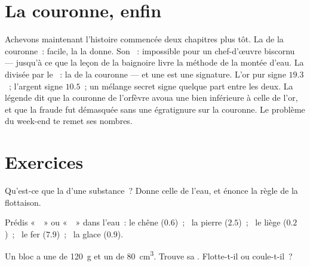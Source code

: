 \section{La couronne, enfin}

\begin{example}\label{ex:g6:density-floating:crown}
Achevons maintenant l'histoire commencée deux chapitres plus tôt. La
 de la couronne~: facile, la  la donne. Son ~:
impossible pour un chef-d'œuvre biscornu --- jusqu'à ce que la leçon
de la baignoire livre la méthode de la montée d'eau. La  divisée
par le ~: la \emph{} de la couronne --- et une
 est une signature. L'or pur signe $19.3$~; l'argent
signe $10.5$~; un mélange secret signe quelque part entre les deux.
La légende dit que la couronne de l'orfèvre avoua une 
bien inférieure à celle de l'or, et que la fraude fut démasquée sans
une égratignure sur la couronne. Le problème du week-end te remet ses
nombres.
\end{example}

\section{Exercices}

\begin{exercise}[$\star$]\label{exo:g6:density-floating:1}
Qu'est-ce que la  d'une substance~? Donne celle de
l'eau, et énonce la règle de la flottaison.
\end{exercise}

\begin{exercise}[$\star$]\label{exo:g6:density-floating:2}
Prédis «~~» ou «~~» dans l'eau~: le chêne ($0.6$)~; \ la
pierre ($2.5$)~; \ le liège ($0.2$)~; \ le fer ($7.9$)~; \ la glace
($0.9$).
\end{exercise}

\begin{exercise}[$\star$]\label{exo:g6:density-floating:3}
Un bloc a une  de \qty{120}{g} et un  de \qty{80}{cm^3}.
Trouve sa . Flotte-t-il ou coule-t-il~?
\end{exercise}

